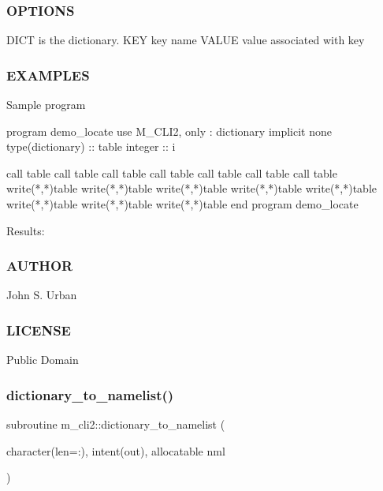 \subsubsection*{O\+P\+T\+I\+O\+NS}

\begin{DoxyVerb}DICT     is the dictionary.
KEY      key name
VALUE    value associated with key
\end{DoxyVerb}


\subsubsection*{E\+X\+A\+M\+P\+L\+ES}

Sample program \begin{DoxyVerb}program demo_locate
use M_CLI2, only : dictionary
implicit none
type(dictionary)             :: table
integer          :: i

call table%
call table%
call table%
call table%
call table%
call table%
call table%
write(*,*)table%
write(*,*)table%
write(*,*)table%
write(*,*)table%
write(*,*)table%
write(*,*)table%
write(*,*)table%
write(*,*)table%
end program demo_locate
\end{DoxyVerb}


Results\+:

\subsubsection*{A\+U\+T\+H\+OR}

John S. Urban \subsubsection*{L\+I\+C\+E\+N\+SE}

Public Domain \mbox{\label{namespacem__cli2_ab43e4e37723a0acc2183fbbf3d8c36bd}} 
\subsubsection{\texorpdfstring{dictionary\+\_\+to\+\_\+namelist()}{dictionary\_to\_namelist()}}
{\footnotesize\ttfamily subroutine m\+\_\+cli2\+::dictionary\+\_\+to\+\_\+namelist (\begin{DoxyParamCaption}\item[{character(len=\+:), intent(out), allocatable}]{nml }\end{DoxyParamCaption})\hspace{0.3cm}{\ttfamily [private]}}



